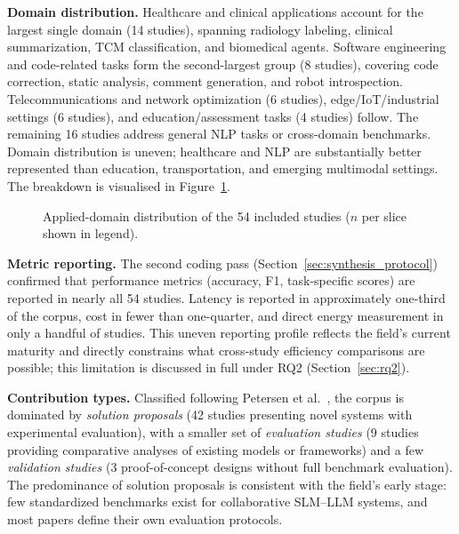 \textbf{Domain distribution.} Healthcare and clinical applications account for the largest single domain (14 studies), spanning radiology labeling, clinical summarization, TCM classification, and biomedical agents. Software engineering and code-related tasks form the second-largest group (8 studies), covering code correction, static analysis, comment generation, and robot introspection. Telecommunications and network optimization (6 studies), edge/IoT/industrial settings (6 studies), and education/assessment tasks (4 studies) follow. The remaining 16 studies address general NLP tasks or cross-domain benchmarks. Domain distribution is uneven; healthcare and NLP are substantially better represented than education, transportation, and emerging multimodal settings. The breakdown is visualised in Figure~\ref{fig:domain-distribution}.

\begin{figure}[!htbp]
\centering
{}
\caption{Applied-domain distribution of the 54 included studies (\(n\) per slice shown in legend).}
\label{fig:domain-distribution}
\end{figure}

\textbf{Metric reporting.} The second coding pass (Section~\ref{sec:synthesis_protocol}) confirmed that performance metrics (accuracy, F1, task-specific scores) are reported in nearly all 54 studies. Latency is reported in approximately one-third of the corpus, cost in fewer than one-quarter, and direct energy measurement in only a handful of studies. This uneven reporting profile reflects the field's current maturity and directly constrains what cross-study efficiency comparisons are possible; this limitation is discussed in full under RQ2 (Section~\ref{sec:rq2}).

\textbf{Contribution types.} Classified following Petersen et al.~\cite{petersen2008systematic}, the corpus is dominated by \textit{solution proposals} (42 studies presenting novel systems with experimental evaluation), with a smaller set of \textit{evaluation studies} (9 studies providing comparative analyses of existing models or frameworks) and a few \textit{validation studies} (3 proof-of-concept designs without full benchmark evaluation). The predominance of solution proposals is consistent with the field's early stage: few standardized benchmarks exist for collaborative SLM--LLM systems, and most papers define their own evaluation protocols.

